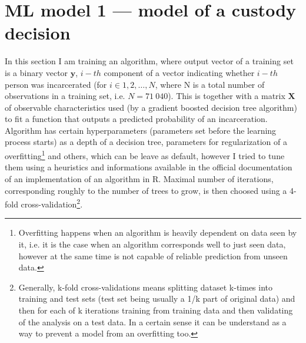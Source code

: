 \documentclass[12pt, twoside,openany]{book} %
\begin{document}
\section{ML model 1 — model of a custody decision}   %
In this section I am training an algorithm, where output vector of a training set is a binary vector $\mathbf{y}$, $i-th$ component of a vector indicating whether $i-th$ person was incarcerated (for $i \in 1, 2, \ldots, N$, where N is a total number of observations in a training set, i.e. $N=71~040$). This is together with a matrix $\mathbf{X}$ of observable characteristics used (by a gradient boosted decision tree algorithm) to fit a function that outputs a predicted probability of an incarceration. Algorithm has certain hyperparameters (parameters set before the learning process starts) as a depth of a decision tree, parameters for regularization of a overfitting\footnote{Overfitting happens when an algorithm is heavily dependent on data seen by it, i.e. it is the case when an algorithm corresponds well to just seen data, however at the same time is not capable of reliable prediction from unseen data.} and others, which can be leave as default, however I tried to tune them using a heuristics and informations available in the official documentation of an implementation of an algorithm in R. Maximal number of iterations, corresponding roughly to the number of trees to grow, is then choosed using a 4-fold cross-validation\footnote{Generally, k-fold cross-validations means splitting dataset k-times into training and test sets (test set being usually a 1/k part of original data) and then for each of k iterations training from training data and then validating of the analysis on a test data. In a certain sense it can be understand as a way to prevent a model from an overfitting too.}.\newline
\end{document}
